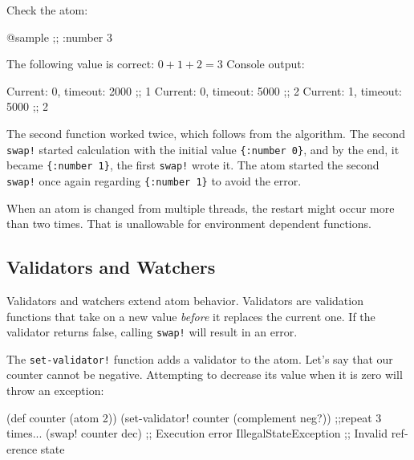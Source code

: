 \fi

\noindent
Check the atom:

\begin{english}
  \begin{clojure}
@sample ;; {:number 3}
  \end{clojure}
\end{english}

\noindent
The following value is correct: $0 + 1 + 2 = 3$
Console output:

\begin{english}
  \begin{text}
Current: 0, timeout: 2000 ;; 1
Current: 0, timeout: 5000 ;; 2
Current: 1, timeout: 5000 ;; 2
  \end{text}
\end{english}

The second function worked twice, which follows from the algorithm.
The second \verb|swap!| started calculation with the initial value \verb|{:number 0}|, and by the end, it became \verb|{:number 1}|, the first \verb|swap!| wrote it.
The atom started the second \verb|swap!| once again regarding \verb|{:number 1}| to avoid the error.

When an atom is changed from multiple threads, the restart might occur more than two times.
That is unallowable for environment dependent functions.

\subsection{Validators and Watchers}


Validators and watchers extend atom behavior.
Validators are validation functions that take on a new value \emph{before} it replaces the current one.
If the validator returns false, calling \verb|swap!| will result in an error.


The \verb|set-validator!| function adds a validator to the atom.
Let's say that our counter cannot be negative.
Attempting to decrease its value when it is zero will throw an exception:

\ifx\DEVICETYPE\MOBILE

\begin{english}
  \begin{clojure}
(def counter (atom 2))
(set-validator!
  counter (complement neg?))
;;repeat 3 times...
(swap! counter dec)
;; Execution error IllegalStateException
;; Invalid reference state
  \end{clojure}
\end{english}


